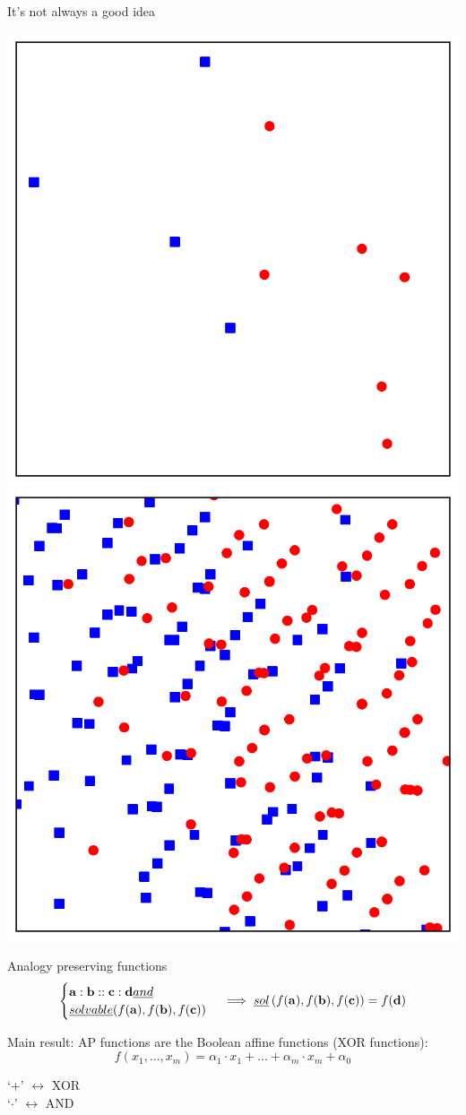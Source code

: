 \documentclass{beamer}
\begin{document}
\begin{frame}{It's not always a good idea}
  \begin{center}
    \includegraphics[width=.5\textwidth]{figures/AE_in_R2_S.pdf}
    \includegraphics[width=.5\textwidth]{figures/AE_in_R2_AE.pdf}
  \end{center}
\end{frame}

\begin{frame}{Analogy preserving functions}
  $$
  \begin{cases}
    \mathbf{a} :  \mathbf{b} ::  \mathbf{c} :  \mathbf{d} \emph{ and }\\
    \emph{solvable}(f(\mathbf{a}), f(\mathbf{b}),  f(\mathbf{c}))
  \end{cases}
  \implies \emph{sol}\left(f(\mathbf{a}),  f(\mathbf{b}),  f(\mathbf{c})\right) =
  f(\mathbf{d})$$

  \alert{Main result}: AP functions are the Boolean affine functions (XOR
  functions):
  $$f(x_1,\ldots , x_m)=\alpha_1\cdot x_1+\ldots +\alpha_m\cdot x_m+\alpha_0$$

  \begin{center}
  `$+$' $\leftrightarrow$ XOR\\
  `$\cdot$' $\leftrightarrow $ AND
  \end{center}
\end{frame}
\end{document}
